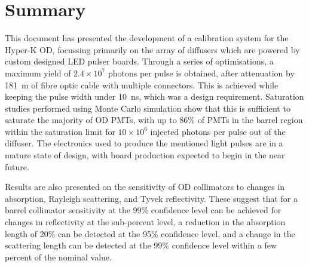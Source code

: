 \documentclass[a4paper,11pt]{article}
\begin{document}
\section{Summary}

This document has presented the development of a calibration system for the Hyper-K OD, focussing primarily on the array of diffusers which are powered by custom designed LED pulser boards. Through a series of optimisations, a maximum yield of $2.4\times10^7$ photons per pulse is obtained, after attenuation by 181~m of fibre optic cable with multiple connectors. This is achieved while keeping the pulse width under 10~ns, which was a design requirement. Saturation studies performed using Monte Carlo simulation show that this is sufficient to saturate the majority of OD PMTs, with up to 86\% of PMTs in the barrel region within the saturation limit for $10\times10^6$ injected photons per pulse out of the diffuser. The electronics used to produce the mentioned light pulses are in a mature state of design, with board production expected to begin in the near future.

Results are also presented on the sensitivity of OD collimators to changes in absorption, Rayleigh scattering, and Tyvek reflectivity. These suggest that for a barrel collimator sensitivity at the 99\% confidence level can be achieved for changes in reflectivity at the sub-percent level, a reduction in the absorption length of 20\% can be
detected at the 95\% confidence level, and a change in the scattering length can be detected at the 99\% confidence level within a few percent of the nominal value.


\appendix







\printbibliography
\end{document}
